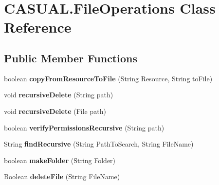 \hypertarget{classCASUAL_1_1FileOperations}{\section{C\-A\-S\-U\-A\-L.\-File\-Operations Class Reference}
\label{classCASUAL_1_1FileOperations}
}
\subsection*{Public Member Functions}
\begin{DoxyCompactItemize}
\item 
\hypertarget{classCASUAL_1_1FileOperations_a4e114f0c6001493ca5ed892e59276420}{boolean {\bfseries copy\-From\-Resource\-To\-File} (String Resource, String to\-File)}\label{classCASUAL_1_1FileOperations_a4e114f0c6001493ca5ed892e59276420}

\item 
\hypertarget{classCASUAL_1_1FileOperations_a8bf6613169e83dee9b70179e1331d99d}{void {\bfseries recursive\-Delete} (String path)}\label{classCASUAL_1_1FileOperations_a8bf6613169e83dee9b70179e1331d99d}

\item 
\hypertarget{classCASUAL_1_1FileOperations_a5fed83c75685ff9516eab0c37658070d}{void {\bfseries recursive\-Delete} (File path)}\label{classCASUAL_1_1FileOperations_a5fed83c75685ff9516eab0c37658070d}

\item 
\hypertarget{classCASUAL_1_1FileOperations_ae522f99e553aaa391e65a8c54ae60083}{boolean {\bfseries verify\-Permissions\-Recursive} (String path)}\label{classCASUAL_1_1FileOperations_ae522f99e553aaa391e65a8c54ae60083}

\item 
\hypertarget{classCASUAL_1_1FileOperations_afe29c51ef53af5e44cc4aa61a9a103d0}{String {\bfseries find\-Recursive} (String Path\-To\-Search, String File\-Name)}\label{classCASUAL_1_1FileOperations_afe29c51ef53af5e44cc4aa61a9a103d0}

\item 
\hypertarget{classCASUAL_1_1FileOperations_a2f6eced2a42e01ee23478f3a0448b139}{boolean {\bfseries make\-Folder} (String Folder)}\label{classCASUAL_1_1FileOperations_a2f6eced2a42e01ee23478f3a0448b139}

\item 
\hypertarget{classCASUAL_1_1FileOperations_a5b1172ca44af911f74d127cd05bf1f72}{Boolean {\bfseries delete\-File} (String File\-Name)}\label{classCASUAL_1_1FileOperations_a5b1172ca44af911f74d127cd05bf1f72}


\end{DoxyCompactItemize}
